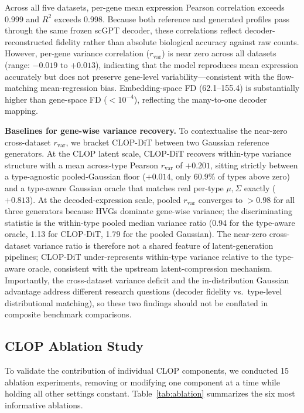 \documentclass[11pt,a4paper]{article}
\begin{document}
Across all five datasets, per-gene mean expression Pearson correlation exceeds 0.999 and $R^2$ exceeds 0.998. Because both reference and generated profiles pass through the same frozen scGPT decoder, these correlations reflect decoder-reconstructed fidelity rather than absolute biological accuracy against raw counts. However, per-gene variance correlation ($r_\text{var}$) is near zero across all datasets (range: $-0.019$ to $+0.013$), indicating that the model reproduces mean expression accurately but does not preserve gene-level variability---consistent with the flow-matching mean-regression bias. Embedding-space FD (62.1--155.4) is substantially higher than gene-space FD ($<10^{-4}$), reflecting the many-to-one decoder mapping.

\textbf{Baselines for gene-wise variance recovery.} To contextualise the near-zero cross-dataset $r_\text{var}$, we bracket CLOP-DiT between two Gaussian reference generators. At the CLOP latent scale, CLOP-DiT recovers within-type variance structure with a mean across-type Pearson $r_\text{var}$ of $+0.201$, sitting strictly between a type-agnostic pooled-Gaussian floor ($+0.014$, only 60.9\% of types above zero) and a type-aware Gaussian oracle that matches real per-type $\mu, \Sigma$ exactly ($+0.813$). At the decoded-expression scale, pooled $r_\text{var}$ converges to $>0.98$ for all three generators because HVGs dominate gene-wise variance; the discriminating statistic is the within-type pooled median variance ratio (0.94 for the type-aware oracle, 1.13 for CLOP-DiT, 1.79 for the pooled Gaussian). The near-zero cross-dataset variance ratio is therefore not a shared feature of latent-generation pipelines; CLOP-DiT under-represents within-type variance relative to the type-aware oracle, consistent with the upstream latent-compression mechanism. Importantly, the cross-dataset variance deficit and the in-distribution Gaussian advantage address different research questions (decoder fidelity vs.\ type-level distributional matching), so these two findings should not be conflated in composite benchmark comparisons.

\subsection{CLOP Ablation Study}\label{sec:ablation}

To validate the contribution of individual CLOP components, we conducted 15 ablation experiments, removing or modifying one component at a time while holding all other settings constant. Table~\ref{tab:ablation} summarizes the six most informative ablations.
\end{document}
